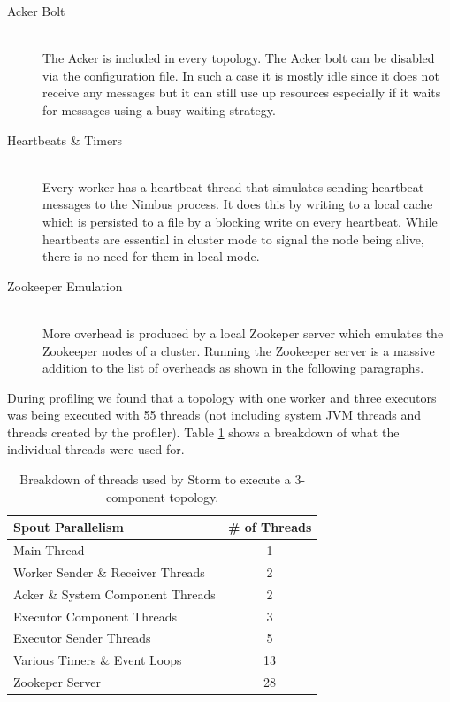 \begin{description}
	\item[Acker Bolt] \hfill \\
	The Acker is included in every topology. The Acker bolt can be disabled via the configuration file. In such a case it is mostly idle since it does not receive any messages but it can still use up resources especially if it waits for messages using a busy waiting strategy.
	\item[Heartbeats \& Timers] \hfill \\
	Every worker has a heartbeat thread that simulates sending heartbeat messages to the Nimbus process. It does this by writing to a local cache which is persisted to a file by a blocking write on every heartbeat. While heartbeats are essential in cluster mode to signal the node being alive, there is no need for them in local mode.
	\item[Zookeeper Emulation] \hfill \\
	More overhead is produced by a local Zookeper server which emulates the Zookeeper nodes of a cluster. Running the Zookeeper server is a massive addition to the list of overheads as shown in the following paragraphs.
\end{description}

During profiling we found that a topology with one worker and three executors was being executed with 55 threads (not including system JVM threads and threads created by the profiler). Table \ref{table:breakdown} shows a breakdown of what the individual threads were used for.


\begin{table}[h!]
\centering
\begin{tabular}{@{}lc@{}}
    \textbf{Spout Parallelism} & \textbf{\# of Threads} \\ \toprule
    Main Thread & 1  \\
	Worker Sender \& Receiver Threads & 2  \\
    Acker \& System Component Threads & 2  \\
    Executor Component Threads & 3  \\
    Executor Sender Threads & 5  \\
    Various Timers \& Event Loops & 13  \\
    Zookeper Server & 28  \\
\end{tabular}
\caption{Breakdown of threads used by Storm to execute a 3-component topology.}
\label{table:breakdown}
\end{table}

